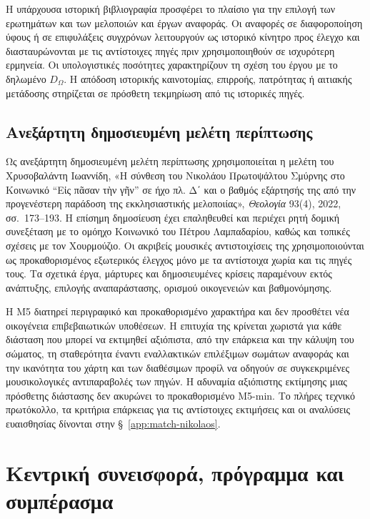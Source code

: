 \documentclass[11pt,a4paper]{article}
\begin{document}
Η υπάρχουσα ιστορική βιβλιογραφία προσφέρει το πλαίσιο για την επιλογή των ερωτημάτων και των μελοποιών και έργων αναφοράς. Οι αναφορές σε διαφοροποίηση ύφους ή σε επιφυλάξεις συγχρόνων λειτουργούν ως ιστορικό κίνητρο προς έλεγχο και διασταυρώνονται με τις αντίστοιχες πηγές πριν χρησιμοποιηθούν σε ισχυρότερη ερμηνεία. Οι υπολογιστικές ποσότητες χαρακτηρίζουν τη σχέση του έργου με το δηλωμένο $D_{\Omega}$. Η απόδοση ιστορικής καινοτομίας, επιρροής, πατρότητας ή αιτιακής μετάδοσης στηρίζεται σε πρόσθετη τεκμηρίωση από τις ιστορικές πηγές.

\subsection{Ανεξάρτητη δημοσιευμένη μελέτη περίπτωσης}

Ως ανεξάρτητη δημοσιευμένη μελέτη περίπτωσης χρησιμοποιείται η μελέτη του Χρυσοβαλάντη Ιωαννίδη, «Η σύνθεση του Νικολάου Πρωτοψάλτου Σμύρνης στο Κοινωνικό ``Εἰς πᾶσαν τὴν γῆν'' σε ήχο πλ. Δ΄ και ο βαθμός εξάρτησής της από την προγενέστερη παράδοση της εκκλησιαστικής μελοποιίας», \emph{Θεολογία} 93(4), 2022, σσ.~173--193. Η επίσημη δημοσίευση έχει επαληθευθεί και περιέχει ρητή δομική συνεξέταση με το ομόηχο Κοινωνικό του Πέτρου Λαμπαδαρίου, καθώς και τοπικές σχέσεις με τον Χουρμούζιο. Οι ακριβείς μουσικές αντιστοιχίσεις της χρησιμοποιούνται ως προκαθορισμένος εξωτερικός έλεγχος μόνο με τα αντίστοιχα χωρία και τις πηγές τους. Τα σχετικά έργα, μάρτυρες και δημοσιευμένες κρίσεις παραμένουν εκτός ανάπτυξης, επιλογής αναπαράστασης, ορισμού οικογενειών και βαθμονόμησης.

Η M5 διατηρεί περιγραφικό και προκαθορισμένο χαρακτήρα και δεν προσθέτει νέα οικογένεια επιβεβαιωτικών υποθέσεων. Η επιτυχία της κρίνεται χωριστά για κάθε διάσταση που μπορεί να εκτιμηθεί αξιόπιστα, από την επάρκεια και την κάλυψη του σώματος, τη σταθερότητα έναντι εναλλακτικών επιλέξιμων σωμάτων αναφοράς και την ικανότητα του χάρτη και των διαθέσιμων προφίλ να οδηγούν σε συγκεκριμένες μουσικολογικές αντιπαραβολές των πηγών. Η αδυναμία αξιόπιστης εκτίμησης μιας πρόσθετης διάστασης δεν ακυρώνει το προκαθορισμένο M5-min. Το πλήρες τεχνικό πρωτόκολλο, τα κριτήρια επάρκειας για τις αντίστοιχες εκτιμήσεις και οι αναλύσεις ευαισθησίας δίνονται στην §~\ref{app:match-nikolaos}.

\section{Κεντρική συνεισφορά, πρόγραμμα και συμπέρασμα}
\end{document}
